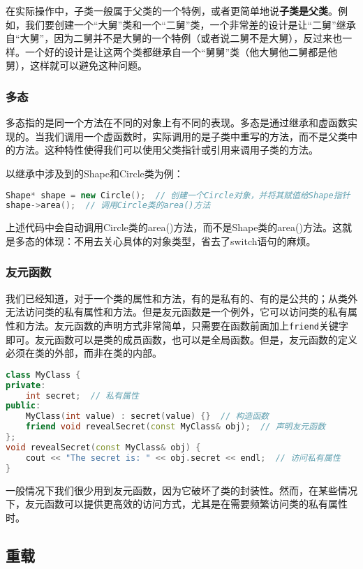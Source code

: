 \documentclass[../main.tex]{subfiles}
\begin{document}
在实际操作中，子类一般属于父类的一个特例，或者更简单地说\textbf{子类是父类}。例如，我们要创建一个“大舅”类和一个“二舅”类，一个非常差的设计是让“二舅”继承自“大舅”，因为二舅并不是大舅的一个特例（或者说二舅不是大舅），反过来也一样。一个好的设计是让这两个类都继承自一个“舅舅”类（他大舅他二舅都是他舅），这样就可以避免这种问题。

\subsubsection{多态}

多态指的是同一个方法在不同的对象上有不同的表现。多态是通过继承和虚函数实现的。当我们调用一个虚函数时，实际调用的是子类中重写的方法，而不是父类中的方法。这种特性使得我们可以使用父类指针或引用来调用子类的方法。

以继承中涉及到的Shape和Circle类为例：
\begin{lstlisting}[language=C++]
Shape* shape = new Circle();  // 创建一个Circle对象，并将其赋值给Shape指针
shape->area();  // 调用Circle类的area()方法
\end{lstlisting}
上述代码中会自动调用Circle类的area()方法，而不是Shape类的area()方法。这就是多态的体现：不用去关心具体的对象类型，省去了switch语句的麻烦。

\subsubsection{友元函数}

我们已经知道，对于一个类的属性和方法，有的是私有的、有的是公共的；从类外无法访问类的私有属性和方法。但是友元函数是一个例外，它可以访问类的私有属性和方法。友元函数的声明方式非常简单，只需要在函数前面加上\texttt{friend}关键字即可。友元函数可以是类的成员函数，也可以是全局函数。但是，友元函数的定义必须在类的外部，而非在类的内部。
\begin{lstlisting}[language=C++]
class MyClass {
private:
    int secret;  // 私有属性
public:
    MyClass(int value) : secret(value) {}  // 构造函数
    friend void revealSecret(const MyClass& obj);  // 声明友元函数
};
void revealSecret(const MyClass& obj) {
    cout << "The secret is: " << obj.secret << endl;  // 访问私有属性
}
\end{lstlisting}

一般情况下我们很少用到友元函数，因为它破坏了类的封装性。然而，在某些情况下，友元函数可以提供更高效的访问方式，尤其是在需要频繁访问类的私有属性时。

\subsection{重载}
\end{document}
